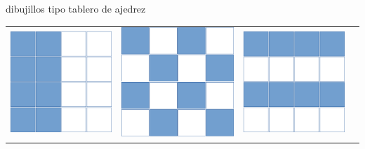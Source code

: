 \documentclass[10pt,oneside]{CBFT_book}
\begin{document}
dibujillos tipo tablero de ajedrez

\begin{center}
\begin{tabular}{l|l|l|l}
\includegraphics[scale=0.3]{images/fig_ajedrez1.pdf} & 
\includegraphics[scale=0.28]{images/fig_ajedrez2.pdf} & 
\includegraphics[scale=0.3]{images/fig_ajedrez3.pdf} &

\end{tabular}
\end{center}
\end{document}
